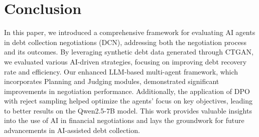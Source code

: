 \section{Conclusion}

In this paper, we introduced a comprehensive framework for evaluating AI agents in debt collection negotiations (DCN), addressing both the negotiation process and its outcomes. By leveraging synthetic debt data generated through CTGAN, we evaluated various AI-driven strategies, focusing on improving debt recovery rate and efficiency. Our enhanced LLM-based multi-agent framework, which incorporates Planning and Judging modules, demonstrated significant improvements in negotiation performance. Additionally, the application of DPO with reject sampling helped optimize the agents’ focus on key objectives, leading to better results on the Qwen2.5-7B model. This work provides valuable insights into the use of AI in financial negotiations and lays the groundwork for future advancements in AI-assisted debt collection.

